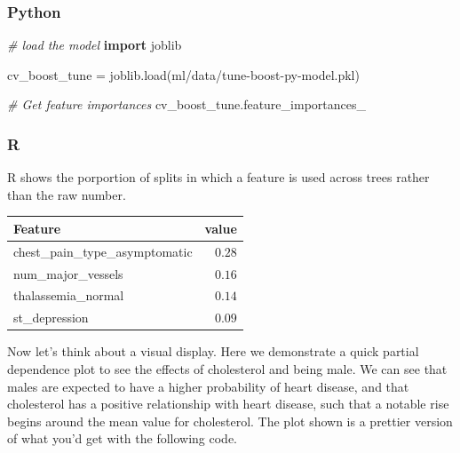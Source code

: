 \documentclass[
  letterpaper,
]{krantz}
\newenvironment{Shaded}{}{}
\newcommand{\CommentTok}[1]{\textcolor[rgb]{0.38,0.63,0.69}{\textit{#1}}}
\newcommand{\FunctionTok}[1]{\textcolor[rgb]{0.02,0.16,0.49}{#1}}
\newcommand{\ImportTok}[1]{\textcolor[rgb]{0.00,0.50,0.00}{\textbf{#1}}}
\newcommand{\NormalTok}[1]{#1}
\newcommand{\OperatorTok}[1]{\textcolor[rgb]{0.40,0.40,0.40}{#1}}
\newcommand{\SpecialCharTok}[1]{\textcolor[rgb]{0.25,0.44,0.63}{#1}}
\newcommand{\StringTok}[1]{\textcolor[rgb]{0.25,0.44,0.63}{#1}}
\begin{document}
\subsubsection{Python}

\begin{Shaded}
\begin{Highlighting}[]
\CommentTok{\# load the model}
\ImportTok{import}\NormalTok{ joblib}

\NormalTok{cv\_boost\_tune }\OperatorTok{=}\NormalTok{ joblib.load(}\StringTok{\textquotesingle{}ml/data/tune{-}boost{-}py{-}model.pkl\textquotesingle{}}\NormalTok{)}

\CommentTok{\# Get feature importances}
\NormalTok{cv\_boost\_tune.feature\_importances\_}
\end{Highlighting}
\end{Shaded}

\subsubsection{R}

R shows the porportion of splits in which a feature is used across trees
rather than the raw number.

\begin{Shaded}
\end{Shaded}

\begin{longtable*}{lr}
\toprule
Feature & value \\ 
\midrule\addlinespace[2.5pt]
chest\_pain\_type\_asymptomatic & \textcolor[HTML]{404040}{$0.28$} \\ 
num\_major\_vessels & \textcolor[HTML]{404040}{$0.16$} \\ 
thalassemia\_normal & \textcolor[HTML]{404040}{$0.14$} \\ 
st\_depression & \textcolor[HTML]{404040}{$0.09$} \\ 
\bottomrule
\end{longtable*}

Now let's think about a visual display. Here we demonstrate a quick
partial dependence plot to see the effects of cholesterol and being
male. We can see that males are expected to have a higher probability of
heart disease, and that cholesterol has a positive relationship with
heart disease, such that a notable rise begins around the mean value for
cholesterol. The plot shown is a prettier version of what you'd get with
the following code.
\end{document}
